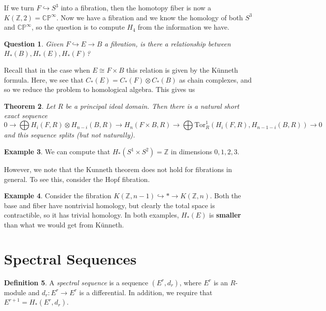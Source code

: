 \documentclass[leqno, openany]{memoir}
\newtheorem{thm}{Theorem}[section]
\newtheorem{quest}[thm]{Question}
\theoremstyle{definition}
\newtheorem{defn}[thm]{Definition}
\newtheorem{exm}[thm]{Example}
\theoremstyle{remark}
\theoremstyle{plain}
\theoremstyle{definition}
\theoremstyle{remark}
\newcommand{\C}{\mathbb{C}}
\newcommand{\Z}{\mathbb{Z}}
\renewcommand{\P}{\mathbb{P}}
\newcommand{\mr}[1]{\mathrm{#1}}
\begin{document}
If we turn $F \hookrightarrow S^3$ into a fibration, then the homotopy fiber is
now a $K(\Z, 2) = \C\P^{\infty}$. Now we have a fibration and we know the
homology of both $S^3$ and $\C\P^{\infty}$, so the question is to compute $H_4$
from the information we have.

\begin{quest} Given $F \hookrightarrow E \to B$ a fibration, is there a
relationship between $H_*(B), H_*(E), H_*(F)$?  \end{quest}

Recall that in the case when $E \cong F \times B$ this relation is given by the
K\"unneth formula. Here, we see that $C_*(E) = C_*(F) \otimes C_*(B)$ as chain
complexes, and so we reduce the problem to homological algebra. This gives us

\begin{thm} Let $R$ be a principal ideal domain. Then there is a natural short
    exact sequence \[ 0 \to \bigoplus H_i(F,R) \otimes H_{n-i}(B, R) \to H_n(F
    \times B, R) \to \bigoplus \mr{Tor}^1_R(H_i(F,R), H_{n-1-i}(B, R)) \to 0 \]
    and this sequence splits (but not naturally).  \end{thm}

\begin{exm} We can compute that $H_*(S^1 \times S^2) = \Z$ in dimensions
$0,1,2,3$.  \end{exm}

However, we note that the Kunneth theorem does not hold for fibrations in
general. To see this, consider the Hopf fibration.

\begin{exm} Consider the fibration $K(\Z, n-1) \hookrightarrow * \to K(\Z, n)$.
    Both the base and fiber have nontrivial homology, but clearly the total
    space is contractible, so it has trivial homology. In both examples,
    $H_*(E)$ is \textbf{smaller} than what we would get from K\"unneth.
\end{exm}

\section{Spectral Sequences}%

\begin{defn} A \textit{spectral sequence} is a sequence $(E^r, d_r)$, where
$E^r$ is an $R$-module and $d_r \colon E^r \to E^r$ is a differential. In
addition, we require that $E^{r+1} = H_*(E^r, d_r)$.  \end{defn}
\end{document}
